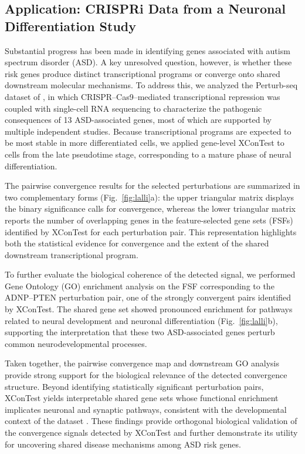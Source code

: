 \documentclass[11pt]{article}
\begin{document}
\subsection*{Application: CRISPRi Data from a Neuronal Differentiation Study}

Substantial progress has been made in identifying genes associated with autism spectrum disorder (ASD). A key unresolved question, however, is whether these risk genes produce distinct transcriptional programs or converge onto shared downstream molecular mechanisms. To address this, we analyzed the Perturb-seq dataset of \cite{lalli2020high}, in which CRISPR–Cas9–mediated transcriptional repression was coupled with single-cell RNA sequencing to characterize the pathogenic consequences of 13 ASD-associated genes, most of which are supported by multiple independent studies. Because transcriptional programs are expected to be most stable in more differentiated cells, we applied gene-level XConTest to cells from the late pseudotime stage, corresponding to a mature phase of neural differentiation.

The pairwise convergence results for the selected perturbations are summarized in two complementary forms (Fig.~\ref{fig:lalli}a): the upper triangular matrix displays the binary significance calls for convergence, whereas the lower triangular matrix reports the number of overlapping genes in the feature-selected gene sets (FSFs) identified by XConTest for each perturbation pair. This representation highlights both the statistical evidence for convergence and the extent of the shared downstream transcriptional program.

To further evaluate the biological coherence of the detected signal, we performed Gene Ontology (GO) enrichment analysis on the FSF corresponding to the ADNP--PTEN perturbation pair, one of the strongly convergent pairs identified by XConTest. The shared gene set showed pronounced enrichment for pathways related to neural development and neuronal differentiation (Fig.~\ref{fig:lalli}b), supporting the interpretation that these two ASD-associated genes perturb common neurodevelopmental processes.

Taken together, the pairwise convergence map and downstream GO analysis provide strong support for the biological relevance of the detected convergence structure. Beyond identifying statistically significant perturbation pairs, XConTest yields interpretable shared gene sets whose functional enrichment implicates neuronal and synaptic pathways, consistent with the developmental context of the dataset \cite{lalli2020high}. These findings provide orthogonal biological validation of the convergence signals detected by XConTest and further demonstrate its utility for uncovering shared disease mechanisms among ASD risk genes.
\end{document}
